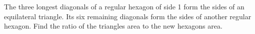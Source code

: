 The three longest diagonals of a regular hexagon of side 1 form the sides of an equilateral triangle. Its six remaining diagonals form the sides of another regular hexagon. Find the ratio of the triangle\textquotesingle s area to the new hexagon\textquotesingle s area.
